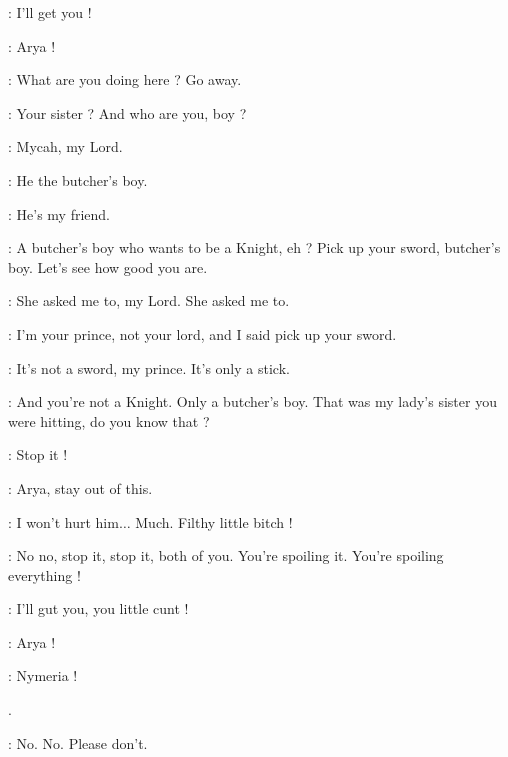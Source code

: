 
\MYCAH: I'll get you ! 

\SANSA: Arya ! 

\ARYA: What are you doing here ? Go away. 

\JOFFREY: Your sister ? And who are you, boy ? 

\MYCAH: Mycah, my Lord. 

\SANSA: He the butcher's boy. 

\ARYA: He's my friend. 

\JOFFREY: A butcher's boy who wants to be a Knight, eh ? Pick up your sword, butcher's boy. Let's see how good you are. 


\MYCAH: She asked me to, my Lord. She asked me to. 

\JOFFREY: I'm your prince, not your lord, and I said pick up your sword. 

\MYCAH: It's not a sword, my prince. It's only a stick. 

\JOFFREY: And you're not a Knight. Only a butcher's boy. That was my lady's sister you were hitting, do you know that ? 

\ARYA: Stop it ! 

\SANSA: Arya, stay out of this. 

\JOFFREY: I won't hurt him$\ldots$ Much.  Filthy little bitch ! 

\SANSA: No no, stop it, stop it, both of you. You're spoiling it. You're spoiling everything ! 


\JOFFREY: I'll gut you, you little cunt ! 

\SANSA: Arya !


\ARYA: Nymeria ! 

.

\JOFFREY: No. No. Please don't. 

